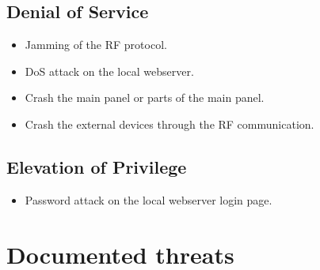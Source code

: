 \subsection{Denial of Service}
\begin{itemize}
    \item Jamming of the RF protocol.
    \item DoS attack on the local webserver.
    \item Crash the main panel or parts of the main panel.
    \item Crash the external devices through the RF communication.
\end{itemize}

\subsection{Elevation of Privilege}
\begin{itemize}
    \item Password attack on the local webserver login page.
\end{itemize}

\section{Documented threats}
